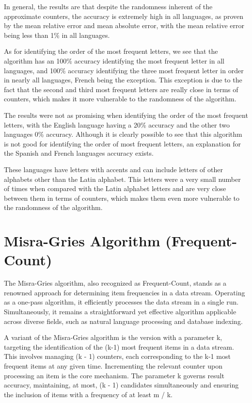 \documentclass[]{revdetua}
\begin{document}
In general, the results are that despite the randomness inherent of the approximate counters, the accuracy is extremely high in all languages, as proven by the mean relative error and mean absolute error, with the mean relative error being less than 1\% in all languages.

As for identifying the order of the most frequent letters, we see that the algorithm has an 100\% accuracy identifying the most frequent letter in all languages, and 100\% accuracy identifying the three most frequent letter in order in nearly all languages, French being the exception. This exception is due to the fact that the second and third most frequent letters are really close in terms of counters, which makes it more vulnerable to the randomness of the algorithm.

The results were not as promising when identifying the order of the most frequent letters, with the English language having a 20\% accuracy and the other two languages 0\% accuracy. Although it is clearly possible to see that this algorithm is not good for identifying the order of most frequent letters, an explanation for the Spanish and French languages accuracy exists.

These languages have letters with accents and can include letters of other alphabets other than the Latin alphabet. This letters were a very small number of times when compared with the Latin alphabet letters and are very close between them in terms of counters, which makes them even more vulnerable to the randomness of the algorithm.

\section{Misra-Gries Algorithm (Frequent-Count)}

The Misra-Gries algorithm, also recognized as Frequent-Count, stands as a renowned approach for determining item frequencies in a data stream. Operating as a one-pass algorithm, it efficiently processes the data stream in a single run. Simultaneously, it remains a straightforward yet effective algorithm applicable across diverse fields, such as natural language processing and database indexing.

A variant of the Misra-Gries algorithm is the version with a parameter k, targeting the identification of the (k-1) most frequent items in a data stream. This involves managing (k - 1) counters, each corresponding to the k-1 most frequent items at any given time. Incrementing the relevant counter upon processing an item is the core mechanism. The parameter k governs result accuracy, maintaining, at most, (k - 1) candidates simultaneously and ensuring the inclusion of items with a frequency of at least m / k.
\end{document}
